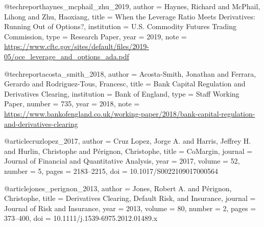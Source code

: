@techreport{haynes_mcphail_zhu_2019,
  author      = {Haynes, Richard and McPhail, Lihong and Zhu, Haoxiang},
  title       = {When the Leverage Ratio Meets Derivatives: Running Out of Options?},
  institution = {U.S. Commodity Futures Trading Commission}, type = {Research Paper}, year = {2019},
  note        = {\url{https://www.cftc.gov/sites/default/files/2019-05/oce_leverage_and_options_ada.pdf}}
}


@techreport{acosta_smith_2018,
  author      = {Acosta-Smith, Jonathan and Ferrara, Gerardo and Rodriguez-Tous, Francesc},
  title       = {Bank Capital Regulation and Derivatives Clearing},
  institution = {Bank of England}, type = {Staff Working Paper}, number = {735}, year = {2018},
  note        = {\url{https://www.bankofengland.co.uk/working-paper/2018/bank-capital-regulation-and-derivatives-clearing}}
}


@article{cruzlopez_2017,
  author  = {Cruz Lopez, Jorge A. and Harris, Jeffrey H. and Hurlin, Christophe and P{\'e}rignon, Christophe},
  title   = {{CoMargin}},
  journal = {Journal of Financial and Quantitative Analysis},
  year    = {2017}, volume = {52}, number = {5}, pages = {2183--2215},
  doi     = {10.1017/S0022109017000564}
}


@article{jones_perignon_2013,
  author  = {Jones, Robert A. and P{\'e}rignon, Christophe},
  title   = {Derivatives Clearing, Default Risk, and Insurance},
  journal = {Journal of Risk and Insurance},
  year    = {2013}, volume = {80}, number = {2}, pages = {373--400},
  doi     = {10.1111/j.1539-6975.2012.01489.x}
}




